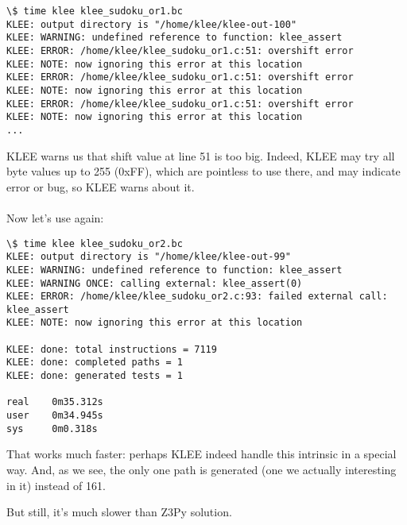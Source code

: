 \begin{lstlisting}
\$ time klee klee_sudoku_or1.bc
KLEE: output directory is "/home/klee/klee-out-100"
KLEE: WARNING: undefined reference to function: klee_assert
KLEE: ERROR: /home/klee/klee_sudoku_or1.c:51: overshift error
KLEE: NOTE: now ignoring this error at this location
KLEE: ERROR: /home/klee/klee_sudoku_or1.c:51: overshift error
KLEE: NOTE: now ignoring this error at this location
KLEE: ERROR: /home/klee/klee_sudoku_or1.c:51: overshift error
KLEE: NOTE: now ignoring this error at this location
...
\end{lstlisting}

KLEE warns us that shift value at line 51 is too big.
Indeed, KLEE may try all byte values up to 255 (0xFF), which are pointless to use there, and may indicate error or bug, so KLEE warns about it.\\
\\
Now let's use  again:



\begin{lstlisting}
\$ time klee klee_sudoku_or2.bc
KLEE: output directory is "/home/klee/klee-out-99"
KLEE: WARNING: undefined reference to function: klee_assert
KLEE: WARNING ONCE: calling external: klee_assert(0)
KLEE: ERROR: /home/klee/klee_sudoku_or2.c:93: failed external call: klee_assert
KLEE: NOTE: now ignoring this error at this location

KLEE: done: total instructions = 7119
KLEE: done: completed paths = 1
KLEE: done: generated tests = 1

real    0m35.312s
user    0m34.945s
sys     0m0.318s
\end{lstlisting}

That works much faster: perhaps KLEE indeed handle this intrinsic in a special way.
And, as we see, the only one path is generated (one we actually interesting in it) instead of 161.

But still, it's much slower than Z3Py solution.

